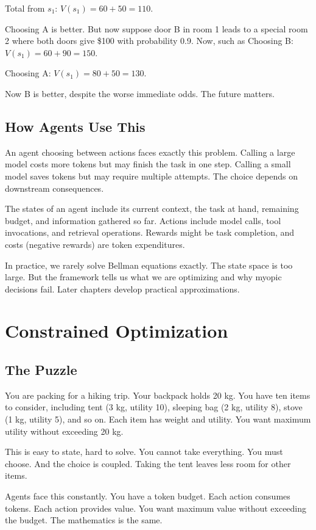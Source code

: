Total from $s_1$: $V(s_1) = 60 + 50 = 110$.

Choosing A is better. But now suppose door B in room 1 leads to a special room 2 where both doors give \$100 with probability 0.9. Now, such as Choosing B: $V(s_1) = 60 + 90 = 150$.

Choosing A: $V(s_1) = 80 + 50 = 130$.

Now B is better, despite the worse immediate odds. The future matters.

\subsection{How Agents Use This}

An agent choosing between actions faces exactly this problem. Calling a large model costs more tokens but may finish the task in one step. Calling a small model saves tokens but may require multiple attempts. The choice depends on downstream consequences.

The states of an agent include its current context, the task at hand, remaining budget, and information gathered so far. Actions include model calls, tool invocations, and retrieval operations. Rewards might be task completion, and costs (negative rewards) are token expenditures.

In practice, we rarely solve Bellman equations exactly. The state space is too large. But the framework tells us what we are optimizing and why myopic decisions fail. Later chapters develop practical approximations.

\section{Constrained Optimization}

\subsection{The Puzzle}

You are packing for a hiking trip. Your backpack holds 20 kg. You have ten items to consider, including tent (3 kg, utility 10), sleeping bag (2 kg, utility 8), stove (1 kg, utility 5), and so on. Each item has weight and utility. You want maximum utility without exceeding 20 kg.

This is easy to state, hard to solve. You cannot take everything. You must choose. And the choice is coupled. Taking the tent leaves less room for other items.

Agents face this constantly. You have a token budget. Each action consumes tokens. Each action provides value. You want maximum value without exceeding the budget. The mathematics is the same.

